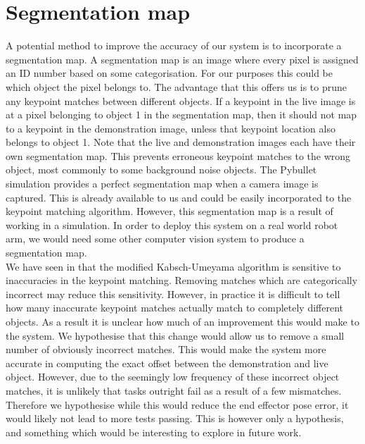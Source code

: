 \section{Segmentation map}
A potential method to improve the accuracy of our system is to incorporate a segmentation map. A segmentation map is an image where every pixel is assigned an ID number based on some categorisation. For our purposes this could be which object the pixel belongs to. The advantage that this offers us is to prune any keypoint matches between different objects. If a keypoint in the live image is at a pixel belonging to object 1 in the segmentation map, then it should not map to a keypoint in the demonstration image, unless that keypoint location also belongs to object 1. Note that the live and demonstration images each have their own segmentation map. This prevents erroneous keypoint matches to the wrong object, most commonly to some background noise objects. The Pybullet simulation provides a perfect segmentation map when a camera image is captured. This is already available to us and could be easily incorporated to the keypoint matching algorithm. However, this segmentation map is a result of working in a simulation. In order to deploy this system on a real world robot arm, we would need some other computer vision system to produce a segmentation map.\\

We have seen in  that the modified Kabsch-Umeyama algorithm is sensitive to inaccuracies in the keypoint matching. Removing matches which are categorically incorrect may reduce this sensitivity. However, in practice it is difficult to tell how many inaccurate keypoint matches actually match to completely different objects. As a result it is unclear how much of an improvement this would make to the system. We hypothesise that this change would allow us to remove a small number of obviously incorrect matches. This would make the system more accurate in computing the exact offset between the demonstration and live object. However, due to the seemingly low frequency of these incorrect object matches, it is unlikely that tasks outright fail as a result of a few mismatches. Therefore we hypothesise while this would reduce the end effector pose error, it would likely not lead to more tests passing. This is however only a hypothesis, and something which would be interesting to explore in future work.

